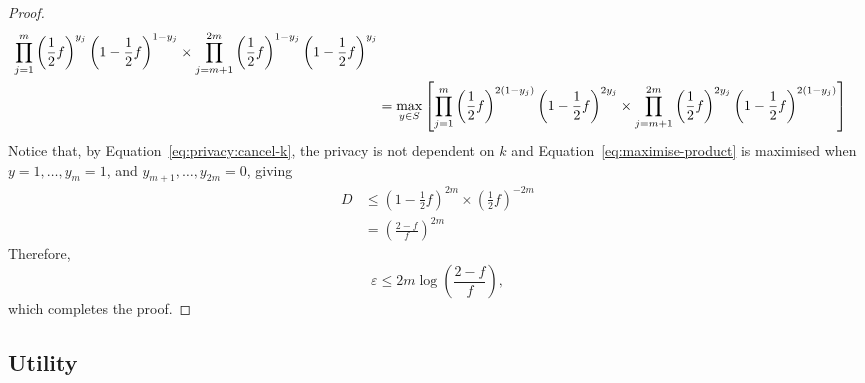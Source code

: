 \documentclass{article}
\begin{document}
\begin{proof}
\begin{align}
{			}{%
				\prod\limits_{j=1}^m \left(\frac{1}{2}f\right)^{y_j}\left(1-\frac{1}{2}f\right)^{1-y_j}%
				\times \prod\limits_{j=m+1}^{2m}\left(\frac{1}{2}f\right)^{1-y_j} \left(1-\frac{1}{2}f\right)^{y_j}%
			}\label{eq:privacy:cancel-k}\\ 
			&=\max_{y\in S}\left[%
				\prod\limits_{j=1}^m \left(\frac{1}{2}f\right)^{2(1-y_j)}\left(1-\frac{1}{2}f\right)^{2y_j}%
				\times \prod\limits_{j=m+1}^{2m}\left(\frac{1}{2}f\right)^{2y_j} \left(1-\frac{1}{2}f\right)^{2(1-y_j)}\right]\label{eq:maximise-product}%
	\end{align} 
	Notice that, by Equation~\ref{eq:privacy:cancel-k}, the privacy is not dependent on $k$ and Equation~\ref{eq:maximise-product} is maximised when $y=1,\ldots,y_m=1$, and $y_{m+1},\ldots,y_{2m}=0$, giving 
	\begin{align*} 
		D &\leq \left(1-\frac{1}{2}f\right)^{2m}\times\left(\frac{1}{2}f\right)^{-2m}\\ 
			&= \left(\frac{2-f}{f}\right)^{2m} 
	\end{align*} 
	Therefore, 
	\begin{equation} 
		\varepsilon \leq 2m\log\left(\frac{2-f}{f}\right), 
	\end{equation} 
    which completes the proof. 
\end{proof} 
 
\subsection{Utility} 
 
\end{document}
